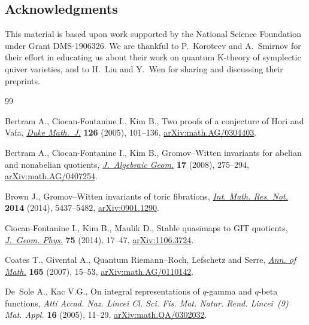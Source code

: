 \documentclass[pdftex]{sigma}
\numberwithin{equation}{section}
\begin{document}
\subsection*{Acknowledgments}

This material is based upon work supported by the National Science Foundation under Grant DMS-1906326.
We are thankful to P.~Koroteev and A.~Smirnov for their effort in educating us about their work on quantum K-theory of symplectic quiver varieties, and to H.~Liu and Y.~Wen for sharing and discussing their preprints.

\begin{thebibliography}{99}
\footnotesize\itemsep=0pt

Bertram A., Ciocan-Fontanine I., Kim B., Two proofs of a conjecture of {H}ori
 and {V}afa, \href{https://doi.org/10.1215/S0012-7094-04-12613-2}{\textit{Duke Math.~J.}} \textbf{126} (2005), 101--136,
 \href{https://arxiv.org/abs/math.AG/0304403}{arXiv:math.AG/0304403}.

Bertram A., Ciocan-Fontanine I., Kim B., Gromov--{W}itten invariants for
 abelian and nonabelian quotients, \href{https://doi.org/10.1090/S1056-3911-07-00456-0}{\textit{J.~Algebraic Geom.}} \textbf{17}
 (2008), 275--294, \href{https://arxiv.org/abs/math.AG/0407254}{arXiv:math.AG/0407254}.

Brown J., Gromov--{W}itten invariants of toric fibrations, \href{https://doi.org/10.1093/imrn/rnt030}{\textit{Int. Math.
 Res. Not.}} \textbf{2014} (2014), 5437--5482, \href{https://arxiv.org/abs/0901.1290}{arXiv:0901.1290}.

Ciocan-Fontanine I., Kim B., Maulik D., Stable quasimaps to {GIT} quotients,
 \href{https://doi.org/10.1016/j.geomphys.2013.08.019}{\textit{J.~Geom. Phys.}} \textbf{75} (2014), 17--47, \href{https://arxiv.org/abs/1106.3724}{arXiv:1106.3724}.

Coates T., Givental A., Quantum {R}iemann--{R}och, {L}efschetz and {S}erre,
 \href{https://doi.org/10.4007/annals.2007.165.15}{\textit{Ann. of Math.}} \textbf{165} (2007), 15--53, \href{https://arxiv.org/abs/math.AG/0110142}{arXiv:math.AG/0110142}.

De~Sole A., Kac V.G., On integral representations of {$q$}-gamma and {$q$}-beta
 functions, \textit{Atti Accad. Naz. Lincei Cl. Sci. Fis. Mat. Natur. Rend.
 Lincei~(9) Mat. Appl.} \textbf{16} (2005), 11--29, \href{https://arxiv.org/abs/math.QA/0302032}{arXiv:math.QA/0302032}.


\end{thebibliography}
\end{document}

